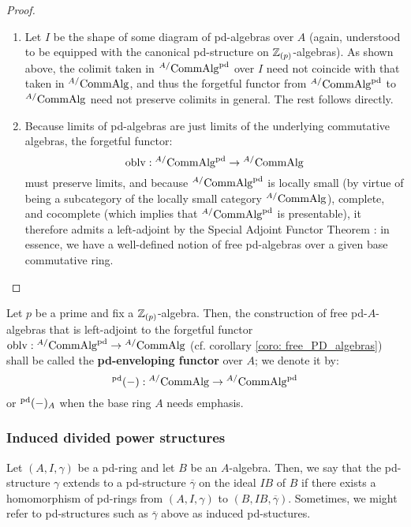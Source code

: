                     \begin{proof}
                        \noindent
                        \begin{enumerate}
                            \item Let $I$ be the shape of some diagram of pd-algebras over $A$ (again, understood to be equipped with the canonical pd-structure on $\mathbb{Z}_{(p)}$-algebras). As shown above, the colimit taken in ${}^{A/}\mathrm{Comm}\mathrm{Alg}^{\mathrm{pd}}$ over $I$ need not coincide with that taken in ${}^{A/}\mathrm{Comm}\mathrm{Alg}$, and thus the forgetful functor from ${}^{A/}\mathrm{Comm}\mathrm{Alg}^{\mathrm{pd}}$ to ${}^{A/}\mathrm{Comm}\mathrm{Alg}$ need not preserve colimits in general. The rest follows directly. 
                            \item Because limits of pd-algebras are just limits of the underlying commutative algebras, the forgetful functor:
                                $$\mathrm{oblv}: {}^{A/}\mathrm{Comm}\mathrm{Alg}^{\mathrm{pd}} \to {}^{A/}\mathrm{Comm}\mathrm{Alg}$$
                            must preserve limits, and because ${}^{A/}\mathrm{Comm}\mathrm{Alg}^{\mathrm{pd}}$ is locally small (by virtue of being a subcategory of the locally small category ${}^{A/}\mathrm{Comm}\mathrm{Alg}$), complete, and cocomplete (which implies that ${}^{A/}\mathrm{Comm}\mathrm{Alg}^{\mathrm{pd}}$ is presentable), it therefore admits a left-adjoint by the Special Adjoint Functor Theorem \cite[Theorem V.8.2]{maclane}: in essence, we have a well-defined notion of free pd-algebras over a given base commutative ring.   
                        \end{enumerate}
                    \end{proof}
                    
                \begin{definition}[pd-envelopes] \label{def: PD_envelopes}
                    Let $p$ be a prime and fix a $\mathbb{Z}_{(p)}$-algebra. Then, the construction of free pd-$A$-algebras that is left-adjoint to the forgetful functor $\mathrm{oblv}: {}^{A/}\mathrm{Comm}\mathrm{Alg}^{\mathrm{pd}} \to {}^{A/}\mathrm{Comm}\mathrm{Alg}$ (cf. corollary \ref{coro: free_PD_algebras}) shall be called the \textbf{pd-enveloping functor} over $A$; we denote it by:
                        $${}^{\mathrm{pd}}(-): {}^{A/}\mathrm{Comm}\mathrm{Alg} \to {}^{A/}\mathrm{Comm}\mathrm{Alg}^{\mathrm{pd}}$$
                    or ${}^{\mathrm{pd}}(-)_A$ when the base ring $A$ needs emphasis.
                \end{definition}
            
            \subsubsection{Induced divided power structures}
                \begin{definition}
                    Let $(A, I, \gamma)$ be a pd-ring and let $B$ be an $A$-algebra. Then, we say that the pd-structure $\gamma$ extends to a pd-structure $\overline{\gamma}$ on the ideal $IB$ of $B$ if there exists a homomorphism of pd-rings from $(A, I, \gamma)$ to $(B, IB, \overline{\gamma})$. Sometimes, we might refer to pd-structures such as $\overline{\gamma}$ above as induced pd-stuctures. 
                \end{definition}
                
